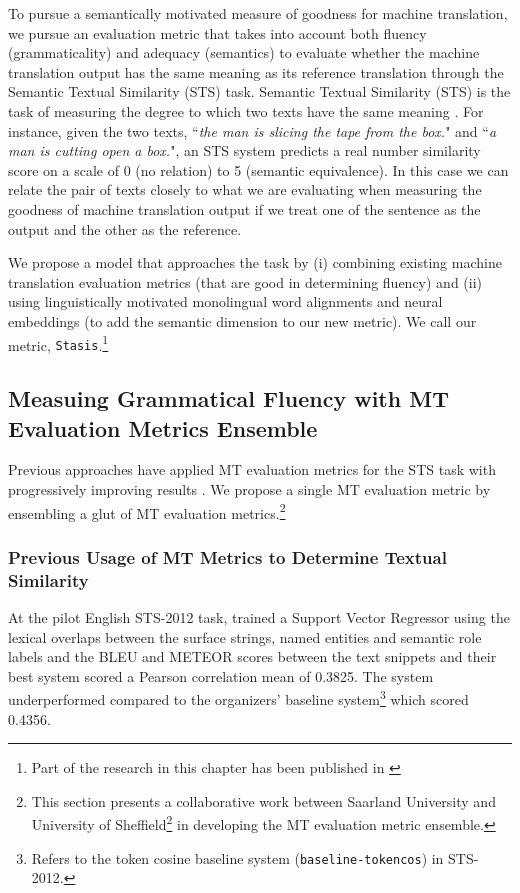 To pursue a semantically motivated measure of goodness for machine translation, we pursue an evaluation metric that takes into account both fluency (grammaticality) and adequacy (semantics) to evaluate whether the machine translation output has the same meaning as its reference translation through the Semantic Textual Similarity (STS) task. Semantic Textual Similarity (STS) is the task of measuring the degree to which two texts have the same meaning \citep{Agirre2014}.  For instance, given the two texts,  ``\emph{the man is slicing the tape from the box.}" and ``\emph{a man is cutting open a box.}", an STS system predicts a real number similarity score on a scale of 0 (no relation) to 5 (semantic equivalence). In this case we can relate the pair of texts closely to what we are evaluating when measuring the goodness of machine translation output if we treat one of the sentence as the output and the other as the reference.

We propose a model that approaches the task by (i) combining existing machine translation evaluation metrics (that are good in determining fluency) and (ii) using linguistically motivated monolingual word alignments and neural embeddings (to add the semantic dimension to our new metric). We call our metric, {\tt Stasis}.\footnote{Part of the research in this chapter has been published in \cite{usaarsheff2015,usaarsheff2016}}

\subsection{Measuing Grammatical Fluency with MT Evaluation Metrics Ensemble}

Previous approaches have applied MT evaluation metrics for the STS task with progressively improving results \citep{Agirre2012,Agirre2013,Agirre2014,agirre2015}. We propose a single MT evaluation metric by ensembling a glut of MT evaluation metrics.\footnote{This section presents a collaborative work between Saarland University and University of Sheffield\footnote{A partner institute in the EXPERT project} in developing the MT evaluation metric ensemble.} 

\subsubsection{Previous Usage of MT Metrics to Determine Textual Similarity}
At the pilot English STS-2012 task, \cite{Rios2012} trained a Support Vector Regressor using the lexical overlaps between the surface strings, named entities and semantic role labels and the BLEU \citep{Papineni2002} and METEOR \citep{Banerjee2005,Denkowski2010} scores between the text snippets and their best system scored a Pearson correlation mean of 0.3825. The system underperformed compared to the organizers' baseline system\footnote{Refers to the token cosine baseline system ({\tt baseline-tokencos}) in STS-2012.} which scored 0.4356. 

